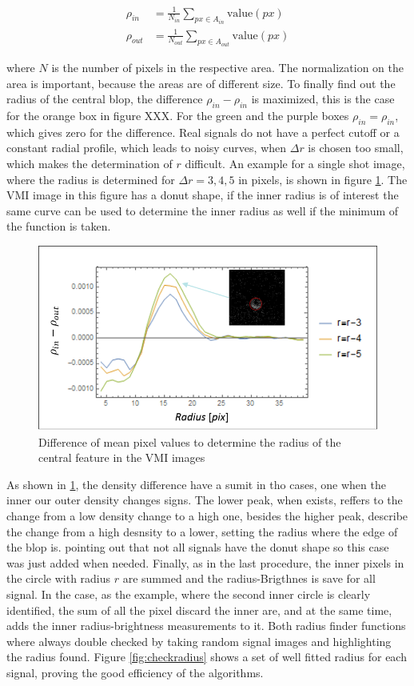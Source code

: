 \begin{align}
\rho_{in} & = \frac{1}{N_{in}} \sum_{px \in A_{in}} \text{value}(px) \\
\rho_{out} & = \frac{1}{N_{out}} \sum_{px \in A_{out}} \text{value} (px)
\end{align}

where $N$ is the number of pixels in the respective area. The normalization on the area is important, because the areas are of different size. To finally find out the radius of the central blop, the difference $\rho_{in}-\rho_{in}$ is maximized, this is the case for the orange box in figure XXX. For the green and the purple boxes $\rho_{in} = \rho_{in}$, which gives zero for the difference.
Real signals do not have a perfect cutoff or a constant radial profile, which leads to noisy curves, when $\Delta r$ is chosen too small, which makes the determination of $r$ difficult. An example for a single shot image, where the radius is determined for $\Delta r = 3,4,5$ in pixels, is shown in figure \ref{fig:density_plot}. The VMI image in this figure has a donut shape, if the inner radius is of interest the same curve can be used to determine the inner radius as well if the minimum of the function is taken.

\begin{figure}

\centering
\includegraphics[width=10 cm]{../images/density_plot.png}
\caption{Difference of mean pixel values to determine the radius of the central feature in the VMI images}
\label{fig:density_plot}
\end{figure}
As shown in \ref{fig:density_plot}, the density difference have a sumit in tho cases, one when the inner our outer density changes signs. The lower peak, when exists, reffers to the change from a low density change to a high one, besides the higher peak, describe the change from a high desnsity to a lower, setting the radius where the edge of the blop is. pointing out that not all signals have the donut shape so this case was just added when needed. Finally, as in the last procedure, the inner pixels in the circle with radius $r$ are summed and the radius-Brigthnes is save for all signal. In the case, as the example, where the second inner circle is clearly identified, the sum of all the pixel discard the inner are, and at the same time, adds the inner radius-brightness measurements to it. 
Both radius finder functions where always double checked by taking random signal images and highlighting the radius found. Figure \ref{fig:checkradius} shows a set of well fitted radius for each signal, proving the good efficiency of the algorithms. 

